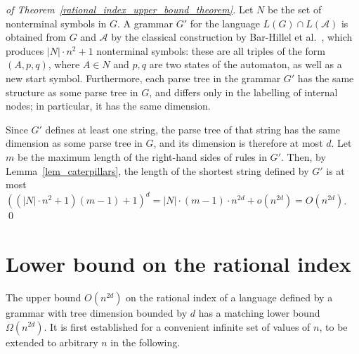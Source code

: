 \documentclass[runningheads]{llncs}
\begin{document}
\begin{proof}[of Theorem~\ref{rational_index_upper_bound_theorem}]
Let $N$ be the set of nonterminal symbols in $G$.
A grammar $G'$ for the language $L(G) \cap L(\mathcal{A})$
is obtained from $G$ and $\mathcal{A}$
by the classical construction by Bar-Hillel et al.~\cite{BarHillel},
which produces $|N| \cdot n^2 + 1$ nonterminal symbols:
these are all triples of the form $(A, p, q)$, where $A \in N$
and $p,q$ are two states of the automaton,
as well as a new start symbol.
Furthermore, each parse tree in the grammar $G'$
has the same structure as some parse tree in $G$,
and differs only in the labelling of internal nodes;
in particular, it has the same dimension.

Since $G'$ defines at least one string,
the parse tree of that string has the same dimension as some parse tree in $G$,
and its dimension is therefore at most $d$.
Let $m$ be the maximum length of the right-hand sides of rules in $G'$.
Then, by Lemma~\ref{lem_caterpillars},
the length of the shortest string defined by $G'$
is at most 
$((|N| \cdot n^2 + 1) (m-1) + 1)^d = |N| \cdot (m-1) \cdot n^{2d} + o(n^{2d}) = O(n^{2d})$.
\qed
\end{proof}







\section{Lower bound on the rational index}\label{section_lower_bound} %

The upper bound $O(n^{2d})$ on the rational index of a language
defined by a grammar with tree dimension bounded by $d$
has a matching lower bound $\Omega(n^{2d})$.
It is first established for a convenient infinite set of values of $n$,
to be extended to arbitrary $n$ in the following.
\end{document}
